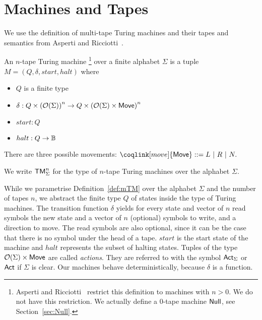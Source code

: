 \section{Machines and Tapes}
\label{sec:machine-tapes}



We use the definition of multi-tape Turing machines and their tapes and semantics from Asperti and Ricciotti~\cite{asperti2015}.

\begin{definition}
  \label{def:mTM}
  An $n$-tape Turing machine%
  \footnote{Asperti and Ricciotti~\cite{asperti2015} restrict this definition to machines with $n>0$.  We do not have this restriction.  We actually
    define a $0$-tape machine $\mathsf{Null}$, see Section~\ref{sec:Null}.} %
  over a finite alphabet $\Sigma$ is a tuple $M = (Q, \delta, start, halt)$ where
  \begin{itemize}
  \item $Q$ is a finite type
  \item $\delta : Q \times \left(\mathcal{O}(\Sigma)\right)^n \rightarrow Q \times \left(\mathcal{O}(\Sigma) \times \mathsf{Move}\right)^n$
  \item $start:Q$
  \item $halt : Q \rightarrow \mathbb{B}$ 
  \end{itemize}
  There are three possible movements: $\coqlink[move]{\MS{Move}} ::= L ~|~ R ~|~ N.$
\end{definition}

We write $\mathsf{TM}_\Sigma^n$ for the type of $n$-tape Turing machines over the alphabet $\Sigma$.

While we parametrise Definition~\ref{def:mTM} over the alphabet $\Sigma$ and the number of tapes $n$, we abstract the finite type $Q$ of states inside
the type of Turing machines.  The transition function $\delta$ yields for every state and vector of $n$ read symbols the new state and a vector of $n$
(optional) symbols to write, and a direction to move.  The read symbols are also optional, since it can be the case that there is no symbol under the
head of a tape.  $start$ is the start state of the machine and $halt$ represents the subset of halting states.  Tuples of the type
$\mathcal{O}(\Sigma) \times \mathsf{Move}$ are called \textit{actions}.  They are referred to with the symbol $\mathsf{Act}_\Sigma$ or $\mathsf{Act}$ if $\Sigma$ is
clear.  Our machines behave deterministically, because $\delta$ is a function.

